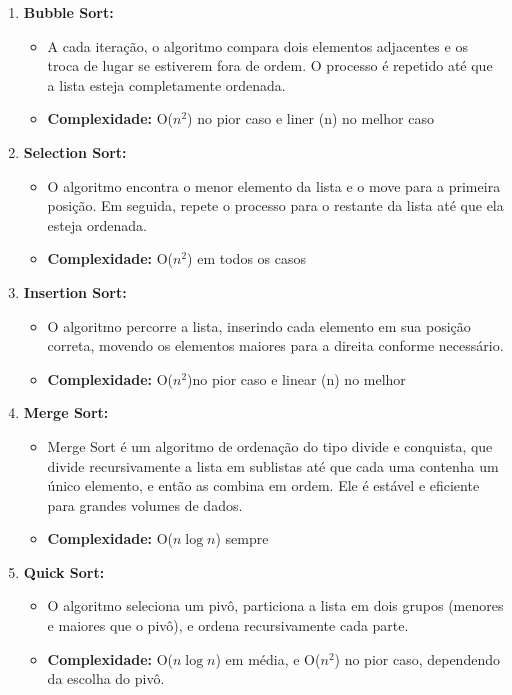 \documentclass[12pt, a4paper]{report}
\begin{document}
\begin{enumerate}
    \item \textbf{Bubble Sort:}
    \begin{itemize}
        \item A cada iteração, o algoritmo compara dois elementos adjacentes e os troca de lugar se estiverem fora de ordem. O processo é repetido até que a lista esteja completamente ordenada.
        \item \textbf{Complexidade:} O($n^2$) no pior caso e liner (n) no melhor caso
    \end{itemize}

    \item \textbf{Selection Sort:}
    \begin{itemize}
        \item O algoritmo encontra o menor elemento da lista e o move para a primeira posição. Em seguida, repete o processo para o restante da lista até que ela esteja ordenada.
        \item \textbf{Complexidade:} O($n^2$) em todos os casos 
    \end{itemize}

    \item \textbf{Insertion Sort:}
    \begin{itemize}
        \item O algoritmo percorre a lista, inserindo cada elemento em sua posição correta, movendo os elementos maiores para a direita conforme necessário.
        \item \textbf{Complexidade:} O($n^2$)no pior caso e linear (n) no melhor
    \end{itemize}

    \item \textbf{Merge Sort:}
    \begin{itemize}
        \item Merge Sort é um algoritmo de ordenação do tipo divide e conquista, que divide recursivamente a lista em sublistas até que cada uma contenha um único elemento, e então as combina em ordem. Ele é estável e eficiente para grandes volumes de dados. 
        \item \textbf{Complexidade:} O($n \log n$) sempre
    \end{itemize}

    \item \textbf{Quick Sort:}
    \begin{itemize}
        \item O algoritmo seleciona um pivô, particiona a lista em dois grupos (menores e maiores que o pivô), e ordena recursivamente cada parte.
        \item \textbf{Complexidade:} O($n \log n$) em média, e O($n^2$) no pior caso, dependendo da escolha do pivô.
    \end{itemize}


\end{enumerate}
\end{document}
